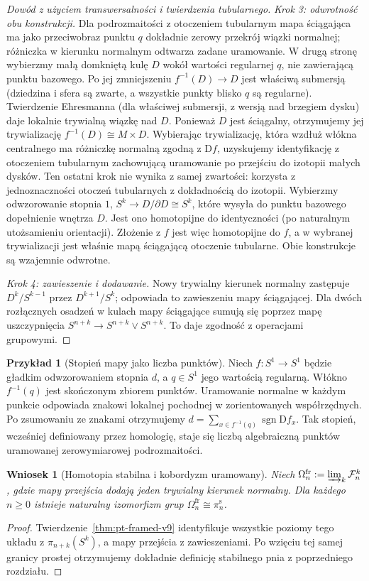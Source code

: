 \documentclass[11pt,a4paper,oneside]{report}
\newcommand{\D}{\mathrm D}
\theoremstyle{plain}
\newtheorem{wniosek}[twierdzenie]{Wniosek}
\theoremstyle{definition}
\newtheorem{przyklad}[twierdzenie]{Przykład}
\theoremstyle{remark}
\begin{document}
\begin{proof}[Dowód z użyciem transwersalności i twierdzenia tubularnego]
\emph{Krok 3: odwrotność obu konstrukcji.}
Dla podrozmaitości z otoczeniem tubularnym mapa
ściągająca ma jako przeciwobraz punktu $q$ dokładnie
zerowy przekrój wiązki normalnej; różniczka w kierunku
normalnym odtwarza zadane uramowanie. W drugą stronę
wybierzmy małą domkniętą kulę $D$ wokół wartości
regularnej $q$, nie zawierającą punktu bazowego.
Po jej zmniejszeniu $f^{-1}(D)\to D$ jest właściwą
submersją (dziedzina i sfera są zwarte, a wszystkie
punkty blisko $q$ są regularne). Twierdzenie Ehresmanna (dla właściwej submersji,
z wersją nad brzegiem dysku) daje lokalnie trywialną
wiązkę nad $D$. Ponieważ $D$ jest ściągalny,
otrzymujemy jej trywializację $f^{-1}(D)\cong M\times D$.
Wybierając trywializację, która wzdłuż włókna centralnego
ma różniczkę normalną zgodną z $\mathrm{D}f$, uzyskujemy
identyfikację z otoczeniem tubularnym zachowującą
uramowanie po przejściu do izotopii małych dysków.
Ten ostatni krok nie wynika z samej zwartości: korzysta
z jednoznaczności otoczeń tubularnych z dokładnością
do izotopii.
Wybierzmy odwzorowanie stopnia $1$,
$S^k\to D/\partial D\cong S^k$, które wysyła
do punktu bazowego dopełnienie wnętrza $D$.
Jest ono homotopijne do identyczności (po naturalnym
utożsamieniu orientacji). Złożenie z $f$ jest więc
homotopijne do $f$, a w wybranej trywializacji
jest właśnie mapą ściągającą otoczenie tubularne.
Obie konstrukcje są wzajemnie odwrotne.

\emph{Krok 4: zawieszenie i dodawanie.}
Nowy trywialny kierunek normalny zastępuje
$D^k/S^{k-1}$ przez $D^{k+1}/S^k$;
odpowiada to zawieszeniu mapy ściągającej.
Dla dwóch rozłącznych osadzeń w kulach mapy
ściągające sumują się poprzez mapę uszczypnięcia
$S^{n+k}\to S^{n+k}\vee S^{n+k}$. To daje
zgodność z operacjami grupowymi.
\end{proof}

\begin{przyklad}[Stopień mapy jako liczba punktów]
Niech $f:S^1\to S^1$ będzie gładkim odwzorowaniem
stopnia $d$, a $q\in S^1$ jego wartością regularną.
Włókno $f^{-1}(q)$ jest skończonym zbiorem punktów.
Uramowanie normalne w każdym punkcie odpowiada znakowi
lokalnej pochodnej w zorientowanych współrzędnych.
Po zsumowaniu ze znakami otrzymujemy
$d=\sum_{x\in f^{-1}(q)}\operatorname{sgn}\D f_x$.
Tak stopień, wcześniej definiowany przez homologię,
staje się liczbą algebraiczną punktów uramowanej
zerowymiarowej podrozmaitości.
\end{przyklad}

\begin{wniosek}[Homotopia stabilna i kobordyzm uramowany]
\label{cor:pt-stable-v9}
Niech $\Omega_n^{\mathrm{fr}}:=\varinjlim_k\mathcal F_n^k$,
gdzie mapy przejścia dodają jeden trywialny kierunek
normalny. Dla każdego $n\ge0$ istnieje naturalny
izomorfizm grup
$\Omega_n^{\mathrm{fr}}\cong\pi_n^{\mathrm s}$.
\end{wniosek}
\begin{proof}
Twierdzenie~\ref{thm:pt-framed-v9} identyfikuje wszystkie
poziomy tego układu z $\pi_{n+k}(S^k)$,
a mapy przejścia z zawieszeniami. Po wzięciu
tej samej granicy prostej otrzymujemy dokładnie
definicję stabilnego pnia z poprzedniego rozdziału.
\end{proof}
\end{document}
